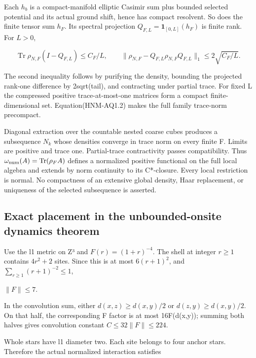 Each \(h_b\) is a compact-manifold elliptic Casimir sum plus bounded selected potential and its actual ground shift, hence has compact resolvent. So does the finite tensor sum \(h_F\). Its spectral projection \(Q_{F,L}=\mathbf1_{[0,L]}(h_F)\) is finite rank. For \(L>0\),

\begin{equation}
\operatorname{Tr}\rho_{N,F}(I-Q_{F,L})\le C_F/L,\qquad
\|\rho_{N,F}-Q_{F,L}\rho_{N,F}Q_{F,L}\|_1\le2\sqrt{C_F/L}.\tag{HNM-AQ1.2}
\label{r29:aq1:eq2}
\end{equation}

The second inequality follows by purifying the density, bounding the projected rank-one difference by 2sqrt(tail), and contracting under partial trace. For fixed L the compressed positive trace-at-most-one matrices form a compact finite-dimensional set. Equation(HNM-AQ1.2) makes the full family trace-norm precompact.

Diagonal extraction over the countable nested coarse cubes produces a subsequence \(N_k\) whose densities converge in trace norm on every finite F. Limits are positive and trace one. Partial-trace contractivity passes compatibility. Thus \(\omega_{\rm num}(A)=\operatorname{Tr}(\rho_F A)\) defines a normalized positive functional on the full local algebra and extends by norm continuity to its C*-closure. Every local restriction is normal. No compactness of an extensive global density, Haar replacement, or uniqueness of the selected subsequence is asserted.

\hypertarget{r29-aq1-exact-placement-in-the-unbounded-onsite-dynamics-theorem}{%
\subsection{Exact placement in the unbounded-onsite dynamics theorem}\label{r29:aq1:r29-aq1-exact-placement-in-the-unbounded-onsite-dynamics-theorem}}

Use the l1 metric on Z³ and \(F(r)=(1+r)^{-4}\). The shell at integer \(r\ge 1\) contains \(4r^{2}+2\) sites. Since this is at most \(6(r+1)^{2}\), and \(\sum_{r\ge1}(r+1)^{-2}\le1\),

\(\|F\|\le 7\).

In the convolution sum, either \(d(x,z)\ge d(x,y)/2\) or \(d(z,y)\ge d(x,y)/2\). On that half, the corresponding F factor is at most 16F(d(x,y)); summing both halves gives convolution constant \(C\le 32\|F\|\le 224\).

Whole stars have l1 diameter two. Each site belongs to four anchor stars. Therefore the actual normalized interaction satisfies

